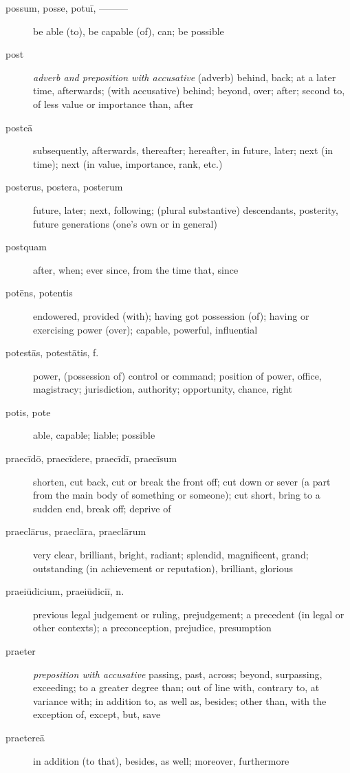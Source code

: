 \begin{description}
    \item[possum, posse, potuī, ———] \marginnote{*}be able (to), be capable (of), can; be possible
    \item[post] \marginnote{*}\textit{adverb and preposition with accusative} (adverb) behind, back; at a later time, afterwards; (with accusative) behind; beyond, over; after; second to, of less value or importance than, after 
    \item[posteā] \marginnote{*}subsequently, afterwards, thereafter; hereafter, in future, later; next (in time); next (in value, importance, rank, etc.)
    \item[posterus, postera, posterum] \marginnote{*}future, later; next, following; (plural substantive) descendants, posterity, future generations (one's own or in general)
    \item[postquam] \marginnote{*}after, when; ever since, from the time that, since
    \item[potēns, potentis] \marginnote{*}endowered, provided (with); having got possession (of); having or exercising power (over); capable, powerful, influential
    \item[potestās, potestātis, f.] \marginnote{*}power, (possession of) control or command; position of power, office, magistracy; jurisdiction, authority; opportunity, chance, right
    \item[potis, pote] \marginnote{*}able, capable; liable; possible
    \item[praecīdō, praecīdere, praecīdī, praecīsum] shorten, cut back, cut or break the front off; cut down or sever (a part from the main body of something or someone); cut short, bring to a sudden end, break off; deprive of
    \item[praeclārus, praeclāra, praeclārum] very clear, brilliant, bright, radiant; splendid, magnificent, grand; outstanding (in achievement or reputation), brilliant, glorious
    \item[praeiūdicium, praeiūdiciī, n.] previous  legal judgement or ruling, prejudgement; a precedent (in legal or other contexts); a preconception, prejudice, presumption
    \item[praeter] \marginnote{*}\textit{preposition with accusative} passing, past, across; beyond, surpassing, exceeding; to a greater degree than; out of line with, contrary to, at variance with; in addition to, as well as, besides; other than, with the exception of, except, but, save
    \item[praetereā] \marginnote{*}in addition (to that), besides, as well; moreover, furthermore

\end{description}
